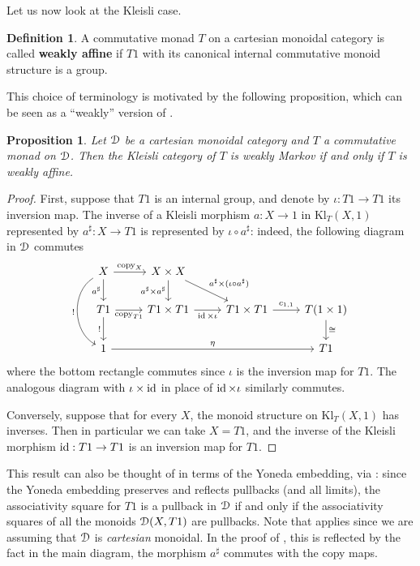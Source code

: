 \documentclass[a4paper,UKenglish,numberwithinsect,cleveref, autoref, thm-restate]{lipics-v2021}
\theoremstyle{plain} %
\newtheorem{myproposition}[mytheorem]{Proposition}
\theoremstyle{definition} %
\newtheorem{mydefinition}[mytheorem]{Definition}
\begin{document}
Let us now look at the Kleisli case.

\begin{mydefinition}\label{defweaklyaffine}
 A commutative monad $T$ on a cartesian monoidal category is called \textbf{weakly affine} if $T1$ with its canonical internal commutative monoid structure is a group.
\end{mydefinition}
%
This choice of terminology is motivated by the following proposition, which can be seen as a ``weakly'' version of .

\begin{myproposition}\label{weaklyboth}
 Let $\mathcal{D}$ be a cartesian monoidal category and $T$ a commutative monad on $\mathcal{D}$. Then the Kleisli category of $T$ is weakly Markov if and only if $T$ is weakly affine.
\end{myproposition}
\begin{proof}
 First, suppose that $T1$ is an internal group, and denote by $\iota:T1\to T1$ its inversion map. 
 The inverse of a Kleisli morphism $a : X \to 1$ in $\mathrm{Kl}_T(X,1)$ represented by $a^\sharp:X\to T1$ is represented by $\iota\circ a^\sharp$: indeed, the following diagram in $\mathcal{D}$ commutes
 \[
  \begin{tikzcd}
  X \ar[bend right=5pc]{dd}[swap]{!} \ar{d}[swap]{a^\sharp} \ar{r}{\mathrm{copy}_X} & X\times X \ar{d}[swap]{a^\sharp\times a^\sharp} \ar{dr}{a^\sharp\times(\iota\circ a^\sharp)} \\
  T1 \ar{d}[swap]{!} \ar{r}[swap]{\mathrm{copy}_{T1}} & T1\times T1 \ar{r}[swap]{\id\times\iota} & T1\times T1 \ar{r}{c_{1,1}} & T(1\times 1) \ar{d}{\cong} \\
  1 \ar{rrr}{\eta} &&& T1
  \end{tikzcd}
 \]
 where the bottom rectangle commutes since $\iota$ is the inversion map for $T1$. The analogous diagram with $\iota\times\operatorname{ id}$ in place of $\operatorname{ id}\times\iota$ 
 similarly commutes.
 
 Conversely, suppose that for every $X$, the monoid structure on $\mathrm{Kl}_T(X,1)$ has inverses. Then in particular we can take $X=T1$, and the inverse of the Kleisli morphism $\operatorname{ id}:T1\to T1$ is an inversion map for $T1$. 
\end{proof}

This result can also be thought of in terms of the Yoneda embedding, via : since the Yoneda embedding preserves and reflects pullbacks (and all limits), the associativity square for $T1$ is a pullback in $\mathcal{D}$ if and only if the associativity squares of all the monoids $\mathcal{D}(X,T1)$ are pullbacks.
Note that  applies since we are assuming that $\mathcal{D}$ is \emph{cartesian} monoidal. In the proof of , this is reflected by the fact in the main diagram, the morphism $a^\sharp$ commutes with the copy maps. 
\end{document}
